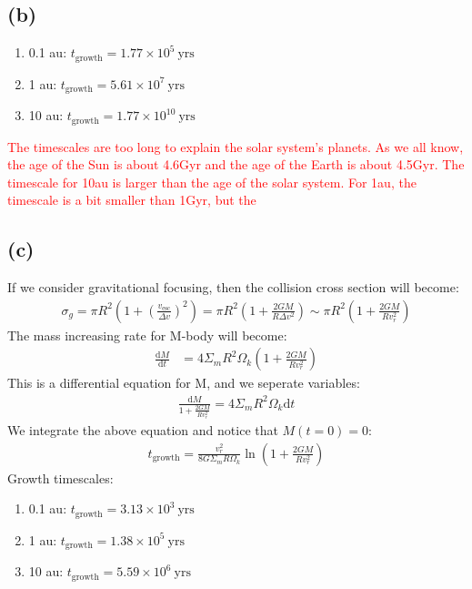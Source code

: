 \documentclass[a4paper,12pt]{article}
\renewcommand{\d}{\mathrm{d}}
\begin{document}
\subsection*{(b)}
\begin{enumerate}
    \item[] 0.1 au: $t_\text{growth} = 1.77 \times 10^5 \ \text{yrs}$
    \item[] 1 au: $t_\text{growth} = 5.61 \times 10^7 \ \text{yrs}$ 
    \item[] 10 au: $t_\text{growth} = 1.77 \times 10^{10} \ \text{yrs}$ 
\end{enumerate}
\textcolor{red}{The timescales are too long to explain the solar system's planets. As we all know, 
the age of the Sun is about 4.6Gyr and the age of the Earth is about 4.5Gyr. 
The timescale for 10au is larger than the age of the solar system.
For 1au, the timescale is a bit smaller than 1Gyr, but the }

\subsection*{(c)}
If we consider gravitational focusing, then the collision cross section will become:
\begin{align*}
    \sigma_g = \pi R^2 (1+(\frac{v_\text{esc}}{\Delta v})^2) = \pi R^2 (1 + \frac{2GM}{R \Delta v^2}) \sim \pi R^2 (1 + \frac{2GM}{R v_r^2})
\end{align*}
The mass increasing rate for M-body will become:
\begin{align*}
    \frac{\d M}{\d t} &= 4 \Sigma_m R^2 \Omega_k (1 + \frac{2GM}{R v_r^2})
\end{align*}
This is a differential equation for M, and we seperate variables:
\begin{align*}
    \frac{\d M}{1 + \frac{2GM}{R v_r^2}} = 4 \Sigma_m R^2 \Omega_k \d t
\end{align*}
We integrate the above equation and notice that $M(t=0)=0$:
\begin{align*}
    t_\text{growth} = \frac{v_r^2}{8G\Sigma_m R \Omega_k} \ln (1+\frac{2GM}{R v_r^2}) 
\end{align*}
Growth timescales:
\begin{enumerate}
    \item[] 0.1 au: $t_\text{growth} = 3.13 \times 10^3 \ \text{yrs}$
    \item[] 1 au: $t_\text{growth} = 1.38 \times 10^5 \ \text{yrs}$ 
    \item[] 10 au: $t_\text{growth} = 5.59 \times 10^6 \ \text{yrs}$ 
\end{enumerate}
\end{document}
